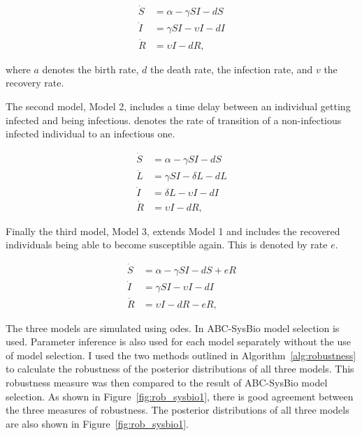 \begin{align}
\dot S &= \alpha - \gamma SI - dS \\
\dot I &= \gamma SI - \upsilon I - dI \\
\dot R &= \upsilon I - dR,
\end{align}

\noindent where $a$ denotes the birth rate, $d$ the death rate, \textgamma{} the infection rate, and $v$ the recovery rate.

The second model, Model 2, includes a time delay between an individual getting infected and being infectious. \textdelta{} denotes the rate of transition of a non-infectious infected individual to an infectious one.

\begin{align}
\dot S &= \alpha - \gamma SI - dS \\
\dot L &= \gamma SI - \delta L - dL \\
\dot I &= \delta L - \upsilon I - dI \\
\dot R &= \upsilon I - dR,
\end{align}

Finally the third model, Model 3, extends Model 1 and includes the recovered individuals being able to become susceptible again. This is denoted by rate $e$.

\begin{align}
\dot S &= \alpha - \gamma SI - dS + eR\\
\dot I &= \gamma SI - \upsilon I - dI \\
\dot R &= \upsilon I - dR - eR,
\end{align}

The three models are simulated using \acrshort{ode}s. In ABC-SysBio model selection is used. Parameter inference is also used for each model separately without the use of model selection. I used the two methods outlined in Algorithm~\ref{alg:robustness} to calculate the robustness of the posterior distributions of all three models. This robustness measure was then compared to the result of ABC-SysBio model selection. As shown in Figure~\ref{fig:rob_sysbio1}, there is good agreement between the three measures of robustness. The posterior distributions of all three models are also shown in Figure~\ref{fig:rob_sysbio1}.

